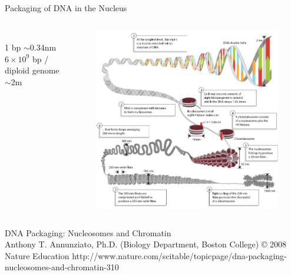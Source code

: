 \documentclass[pdf]{beamer}
\begin{document}
\begin{frame}{Packaging of DNA in the Nucleus}
  \begin{columns}
    \begin{column}{0.35\textwidth}
      \footnotesize{
        \\
        1 bp $\sim$0.34nm\\
        $6 \times 10^9$ bp / diploid genome\\
        $\sim$2m
      }
    \end{column}
    \begin{column}{0.65\textwidth}
      \begin{figure}[ht]
        \includegraphics[width=\textwidth]{images/DNA_chromatin}
      \end{figure}
    \end{column}
  \end{columns}
  {\tiny 
  \linespread{0.5}
  DNA Packaging: Nucleosomes and Chromatin\\
  Anthony T. Annunziato, Ph.D. (Biology Department, Boston College) © 2008 Nature Education 
  http://www.nature.com/scitable/topicpage/dna-packaging-nucleosomes-and-chromatin-310
  \par
  }
\end{frame}
\end{document}

